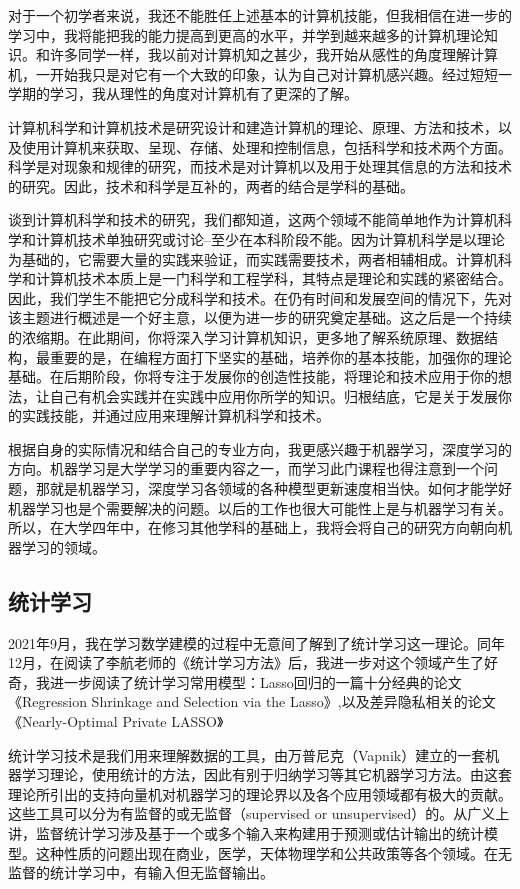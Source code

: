 \documentclass{article}
\begin{document}
\par
对于一个初学者来说，我还不能胜任上述基本的计算机技能，但我相信在进一步的学习中，我将能把我的能力提高到更高的水平，并学到越来越多的计算机理论知识。和许多同学一样，我以前对计算机知之甚少，我开始从感性的角度理解计算机，一开始我只是对它有一个大致的印象，认为自己对计算机感兴趣。经过短短一学期的学习，我从理性的角度对计算机有了更深的了解。
\par
计算机科学和计算机技术是研究设计和建造计算机的理论、原理、方法和技术，以及使用计算机来获取、呈现、存储、处理和控制信息，包括科学和技术两个方面。科学是对现象和规律的研究，而技术是对计算机以及用于处理其信息的方法和技术的研究。因此，技术和科学是互补的，两者的结合是学科的基础。\par
谈到计算机科学和技术的研究，我们都知道，这两个领域不能简单地作为计算机科学和计算机技术单独研究或讨论--至少在本科阶段不能。因为计算机科学是以理论为基础的，它需要大量的实践来验证，而实践需要技术，两者相辅相成。计算机科学和计算机技术本质上是一门科学和工程学科，其特点是理论和实践的紧密结合。因此，我们学生不能把它分成科学和技术。在仍有时间和发展空间的情况下，先对该主题进行概述是一个好主意，以便为进一步的研究奠定基础。这之后是一个持续的浓缩期。在此期间，你将深入学习计算机知识，更多地了解系统原理、数据结构，最重要的是，在编程方面打下坚实的基础，培养你的基本技能，加强你的理论基础。在后期阶段，你将专注于发展你的创造性技能，将理论和技术应用于你的想法，让自己有机会实践并在实践中应用你所学的知识。归根结底，它是关于发展你的实践技能，并通过应用来理解计算机科学和技术。\par
根据自身的实际情况和结合自己的专业方向，我更感兴趣于机器学习，深度学习的方向。机器学习是大学学习的重要内容之一，而学习此门课程也得注意到一个问题，那就是机器学习，深度学习各领域的各种模型更新速度相当快。如何才能学好机器学习也是个需要解决的问题。以后的工作也很大可能性上是与机器学习有关。所以，在大学四年中，在修习其他学科的基础上，我将会将自己的研究方向朝向机器学习的领域。

\subsection{统计学习}
2021年9月，我在学习数学建模的过程中无意间了解到了统计学习这一理论。同年12月，在阅读了李航老师的《统计学习方法》\citep{tjxxff}后，我进一步对这个领域产生了好奇，我进一步阅读了统计学习常用模型：Lasso回归的一篇十分经典的论文《Regression Shrinkage and Selection via the Lasso》\citep{lasso},以及差异隐私相关的论文《Nearly-Optimal Private LASSO》\citep{dp}

统计学习技术是我们用来理解数据的工具，由万普尼克（Vapnik）建立的一套机器学习理论，使用统计的方法，因此有别于归纳学习等其它机器学习方法。由这套理论所引出的支持向量机对机器学习的理论界以及各个应用领域都有极大的贡献。这些工具可以分为有监督的或无监督（supervised or unsupervised）的。从广义上讲，监督统计学习涉及基于一个或多个输入来构建用于预测或估计输出的统计模型。这种性质的问题出现在商业，医学，天体物理学和公共政策等各个领域。在无监督的统计学习中，有输入但无监督输出。
\end{document}
